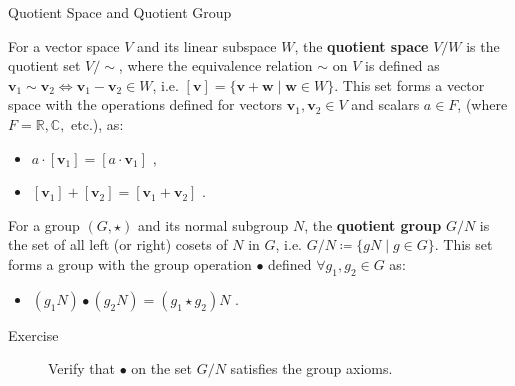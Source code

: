 \documentclass{beamer}
\newcommand\boldtext[1]{\textcolor{bolds}{\textbf{#1}}}
\begin{document}
\begin{frame}{Quotient Space and Quotient Group}
    \begin{definition}
        For a vector space $V$ and its linear subspace $W$, the \boldtext{quotient space} $V/W$ is the quotient set $V/{\sim}$, where the equivalence relation $\sim$ on $V$ is defined as $\mathbf{v}_1\sim\mathbf{v}_2\iff\mathbf{v}_1-\mathbf{v}_2\in W$, i.e. $[\mathbf{v}]=\{\mathbf{v}+\mathbf{w}\mid\mathbf{w}\in W\}$. This set forms a vector space with the operations defined for vectors $\mathbf{v}_1,\mathbf{v}_2\in V$ and scalars $a\in F$, (where $F=\mathbb{R}, \mathbb{C},$ etc.), as:
        \begin{itemize}
            \item $a\cdot[\mathbf{v}_1]=[a\cdot\mathbf{v}_1]$ ,
            \item $[\mathbf{v}_1]+[\mathbf{v}_2]=[\mathbf{v}_1+\mathbf{v}_2]$ .
        \end{itemize}
    \end{definition}
    \begin{definition}
        For a group $(G,\star)$ and its normal subgroup $N$, the \boldtext{quotient group} $G/N$ is the set of all left (or right) cosets of $N$ in $G$, i.e. $G/N\coloneqq\{gN\mid g\in G\}$. This set forms a group with the group operation $\bullet$ defined $\forall g_1,g_2\in G$ as:
        \begin{itemize}
            \item $(g_1N)\bullet(g_2N)=(g_1\star g_2)N$ .
        \end{itemize}
    \end{definition}
    \begin{description}
        \item[Exercise] Verify that $\bullet$ on the set $G/N$ satisfies the group axioms.
    \end{description}
\end{frame}
\end{document}
